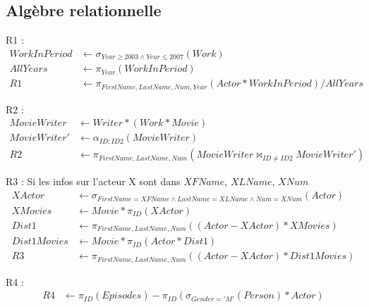 \documentclass[a4paper,12pt]{article}
\begin{document}
\subsection{Algèbre relationnelle}
\begin{list}{-}{}
  \item R1 :
    \begin{align*}
      WorkInPeriod & \leftarrow \sigma_{Year \geq 2003 \wedge Year \leq 2007} (Work) \\
      AllYears & \leftarrow \pi_{Year} (WorkInPeriod)\\
      R1 & \leftarrow \pi_{FirstName, LastName, Num, Year} (Actor * WorkInPeriod) / AllYears
    \end{align*}
  \item R2 :
    \begin{align*}
      MovieWriter & \leftarrow Writer * (Work * Movie) \\
      MovieWriter' & \leftarrow \alpha_{ID:ID2} (MovieWriter) \\
      R2 & \leftarrow \pi_{FirstName,LastName,Num} (MovieWriter \Join_{ID \neq ID2} MovieWriter')
    \end{align*}
  \item R3 :
    Si les infos sur l'acteur X sont dans $XFName$, $XLName$, $XNum$
    \begin{alignat*}{4}
      XActor & \leftarrow \sigma_{FirstName = XFName \wedge LastName = XLName \wedge Num = XNum} (Actor) \\
      XMovies & \leftarrow Movie * \pi_{ID}(XActor) \\
      Dist1 & \leftarrow \pi_{FirstName,LastName,Num}((Actor - XActor) * XMovies) \\
      Dist1Movies & \leftarrow Movie * \pi_{ID}(Actor * Dist1) \\
      R3 & \leftarrow \pi_{FirstName,LastName,Num}((Actor - XActor) * Dist1Movies)
    \end{alignat*}
  \item R4 :
    \begin{align*}
      R4 & \leftarrow \pi_{ID} (Episodes) - \pi_{ID} (\sigma_{Gender='M'} (Person) * Actor)
    \end{align*}
\end{list}
\end{document}
